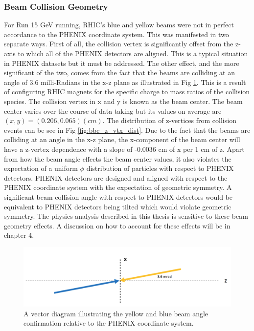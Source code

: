 \subsubsection{Beam Collision Geometry}
For Run 15  GeV running, RHIC's blue and yellow beams were not in perfect accordance to the PHENIX coordinate system. This was manifested in two separate ways.
First of all, the collision vertex is significantly offset from the z-axis to which all of the PHENIX detectors are aligned. This is a typical situation in PHENIX datasets but it must be addressed. The other effect, and the more significant of the two, comes from the fact that the beams are colliding at an angle of 3.6 milli-Radians in the x-z plane as illustrated in Fig \ref{fig:beam_angle}. This is a result of configuring RHIC magnets for the specific charge to mass ratios of the \pau collision species.
The collision vertex in x and y is known as the beam center. The beam center varies over the course of data taking but its values on average are $(x,y) = (0.206,0.065) (cm)$. The distribution of z-vertices from collision events can be see in Fig \ref{fig:bbc_z_vtx_dist}. Due to the fact that the beams are colliding at an angle in the x-z plane, the x-component of the beam center will have a z-vertex dependence with a slope of -0.0036 cm of x per 1 cm of z.
Apart from how the beam angle effects the beam center values, it also violates the expectation of a uniform $\phi$ distribution of particles with respect to PHENIX detectors. PHENIX detectors are designed and aligned with respect to the PHENIX coordinate system with the expectation of geometric symmetry. A significant beam collision angle with respect to PHENIX detectors would be equivalent to PHENIX detectors being tilted which would violate geometric symmetry.
The physics analysis described in this thesis is sensitive to these beam geometry effects. A discussion on how to account for these effects will be in chapter 4.

\begin{figure}[h!]
\begin{center}
\includegraphics[width=0.85\linewidth]{figs/beam_angle.png}
\caption{A vector diagram illustrating the yellow and blue beam angle confirmation relative to the PHENIX coordinate system.}\label{fig:beam_angle}

\end{center}
\end{figure}

